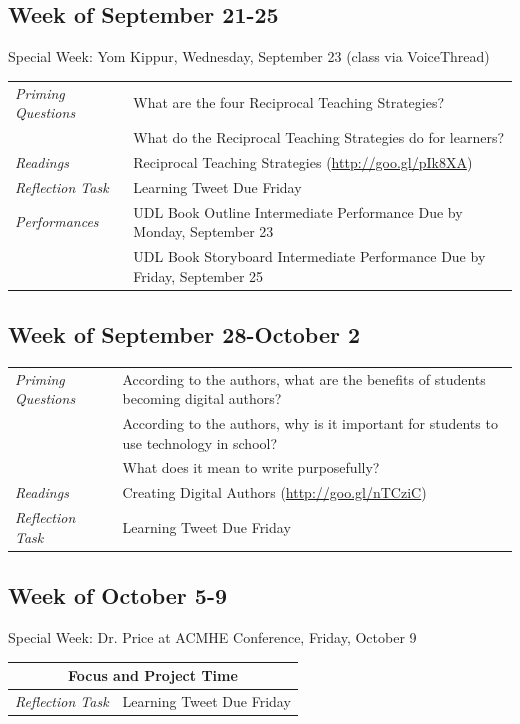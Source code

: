 \documentclass{tufte-handout}
\newcommand{\tabpq}{\faQuestionCircle\medspace\textit{Priming Questions}}
\newcommand{\tabread}{\faBook\medspace\textit{Readings}}
\newcommand{\tabperformance}{\faTasks\medspace\textit{Performances}}
\newcommand{\tabtweet}{\faLightbulbO\medspace\textit{Reflection Task} & Learning Tweet Due Friday \\}
\newenvironment{tabsched}
	{\small
	\begin{tabular}{p{1.5in}p{4.5in}}
	\toprule}
	{\bottomrule
	\end{tabular}
	\normalsize}
\newenvironment{specweek}
	{\begin{center}
		\fontseries{b} \faBullhorn \medspace Special Week: }
		{\medspace \faBullhorn \fontseries{m}
	\end{center}}
\newcommand{\weeksix}{September 21-25}
\newcommand{\weekseven}{September 28-October 2}
\newcommand{\weekeight}{October 5-9}
\newcommand{\yomkippur}{Yom Kippur, Wednesday, September 23 (class via VoiceThread)}
\newcommand{\acmhe}{Dr. Price at ACMHE Conference, Friday, October 9}
\begin{document}
\subsection{Week of \weeksix}

\begin{specweek}\yomkippur\end{specweek}

\begin{tabsched}
	\tabpq & What are the four Reciprocal Teaching Strategies? \\
	& What do the Reciprocal Teaching Strategies do for learners? \\
	\midrule
	\tabread & Reciprocal Teaching Strategies (\url{http://goo.gl/pIk8XA}) \\
	\midrule
	\tabtweet
	\midrule
	\tabperformance & UDL Book Outline Intermediate Performance Due by Monday, September 23 \\
	& UDL Book Storyboard Intermediate Performance Due by Friday, September 25 \\

\end{tabsched}

\subsection{Week of \weekseven}

\begin{tabsched}
	\tabpq & According to the authors, what are the benefits of students becoming digital authors? \\
	& According to the authors, why is it important for students to use technology in school? \\
	& What does it mean to write purposefully? \\
	\midrule
	\tabread & Creating Digital Authors (\url{http://goo.gl/nTCziC}) \\
	\midrule
	\tabtweet
\end{tabsched}

\subsection{Week of \weekeight}

\begin{specweek}\acmhe\end{specweek}

\begin{tabsched}
	\multicolumn{2}{c}{\faLaptop\medspace\textbf{Focus and Project Time}\medspace\faLaptop} \\
	\midrule
	\tabtweet
\end{tabsched}
\end{document}
